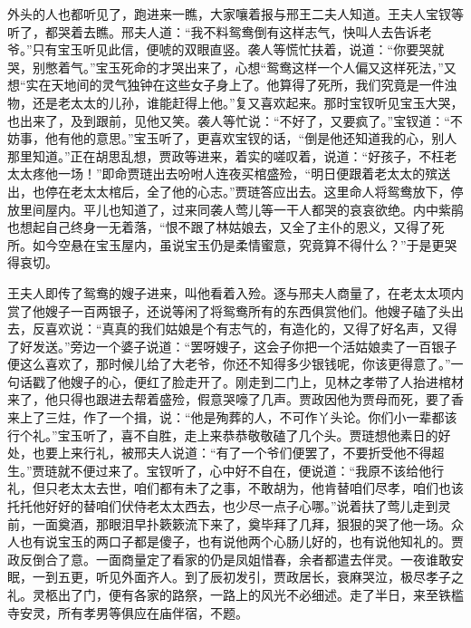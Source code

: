 \begin{parag}
    外头的人也都听见了，跑进来一瞧，大家嚷着报与邢王二夫人知道。王夫人宝钗等听了，都哭着去瞧。邢夫人道：“我不料鸳鸯倒有这样志气，快叫人去告诉老爷。”只有宝玉听见此信，便唬的双眼直竖。袭人等慌忙扶着，说道：“你要哭就哭，别憋着气。”宝玉死命的才哭出来了，心想“鸳鸯这样一个人偏又这样死法，”又想“实在天地间的灵气独钟在这些女子身上了。他算得了死所，我们究竟是一件浊物，还是老太太的儿孙，谁能赶得上他。”复又喜欢起来。那时宝钗听见宝玉大哭，也出来了，及到跟前，见他又笑。袭人等忙说：“不好了，又要疯了。”宝钗道：“不妨事，他有他的意思。”宝玉听了，更喜欢宝钗的话，“倒是他还知道我的心，别人那里知道。”正在胡思乱想，贾政等进来，着实的嗟叹着，说道：“好孩子，不枉老太太疼他一场！”即命贾琏出去吩咐人连夜买棺盛殓，“明日便跟着老太太的殡送出，也停在老太太棺后，全了他的心志。”贾琏答应出去。这里命人将鸳鸯放下，停放里间屋内。平儿也知道了，过来同袭人莺儿等一干人都哭的哀哀欲绝。内中紫鹃也想起自己终身一无着落，“恨不跟了林姑娘去，又全了主仆的恩义，又得了死所。如今空悬在宝玉屋内，虽说宝玉仍是柔情蜜意，究竟算不得什么？”于是更哭得哀切。
\end{parag}


\begin{parag}
    王夫人即传了鸳鸯的嫂子进来，叫他看着入殓。逐与邢夫人商量了，在老太太项内赏了他嫂子一百两银子，还说等闲了将鸳鸯所有的东西俱赏他们。他嫂子磕了头出去，反喜欢说：“真真的我们姑娘是个有志气的，有造化的，又得了好名声，又得了好发送。”旁边一个婆子说道：“罢呀嫂子，这会子你把一个活姑娘卖了一百银子便这么喜欢了，那时候儿给了大老爷，你还不知得多少银钱呢，你该更得意了。”一句话戳了他嫂子的心，便红了脸走开了。刚走到二门上，见林之孝带了人抬进棺材来了，他只得也跟进去帮着盛殓，假意哭嚎了几声。贾政因他为贾母而死，要了香来上了三炷，作了一个揖，说：“他是殉葬的人，不可作丫头论。你们小一辈都该行个礼。”宝玉听了，喜不自胜，走上来恭恭敬敬磕了几个头。贾琏想他素日的好处，也要上来行礼，被邢夫人说道：“有了一个爷们便罢了，不要折受他不得超生。”贾琏就不便过来了。宝钗听了，心中好不自在，便说道：“我原不该给他行礼，但只老太太去世，咱们都有未了之事，不敢胡为，他肯替咱们尽孝，咱们也该托托他好好的替咱们伏侍老太太西去，也少尽一点子心哪。”说着扶了莺儿走到灵前，一面奠酒，那眼泪早扑簌簌流下来了，奠毕拜了几拜，狠狠的哭了他一场。众人也有说宝玉的两口子都是傻子，也有说他两个心肠儿好的，也有说他知礼的。贾政反倒合了意。一面商量定了看家的仍是凤姐惜春，余者都遣去伴灵。一夜谁敢安眠，一到五更，听见外面齐人。到了辰初发引，贾政居长，衰麻哭泣，极尽孝子之礼。灵柩出了门，便有各家的路祭，一路上的风光不必细述。走了半日，来至铁槛寺安灵，所有孝男等俱应在庙伴宿，不题。
\end{parag}


